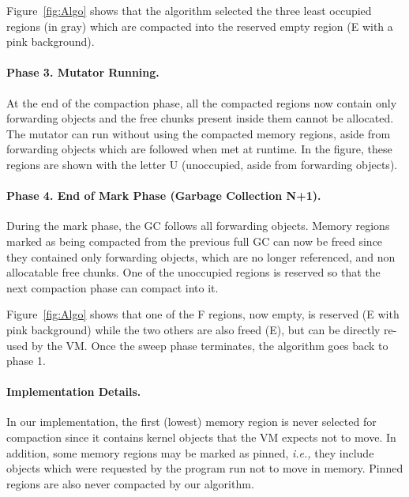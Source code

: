 \documentclass[sigplan,10pt,review,anonymous]{acmart}\settopmatter{printfolios=true,printccs=false,printacmref=false}
\newcommand{\egb}[1]{\color{blue}\fbox{\bfseries\sffamily\scriptsize Elisa:}{\sf\small$\blacktriangleright$\textit{#1}$\blacktriangleleft$}\color{black}}
\def\ie{\emph{i.e., }}
\begin{document}
Figure~\ref{fig:Algo} shows that the algorithm selected the three least occupied regions (in gray) which are compacted into the reserved empty region (E with a pink background).

\paragraph{Phase 3. Mutator Running.}  At the end of the compaction phase, all the compacted regions now contain only forwarding objects and the free chunks present inside them cannot be allocated. 
The mutator can run without using the compacted memory regions, aside from forwarding objects which are followed when met at runtime. In the figure, these regions are shown with the letter U (unoccupied, aside from forwarding objects).

\paragraph{Phase 4. End of Mark Phase (Garbage Collection N+1).} During the mark phase, the GC follows all forwarding objects. Memory regions marked as being compacted from the previous full GC can now be freed since they contained only forwarding objects, which are no longer referenced, and non allocatable free chunks. One of the unoccupied regions is reserved so that the next compaction phase can compact into it.

Figure~\ref{fig:Algo} shows that one of the F regions, now empty, is reserved (E with pink background) while the two others are also freed (E), but can be directly re-used by the VM. Once the sweep phase terminates, the algorithm goes back to phase 1.

\paragraph{Implementation Details.}
In our implementation, the first (lowest) memory region is never selected for compaction since it contains kernel objects that the VM expects not to move. In addition, some memory regions may be marked as pinned, \ie they include objects which were requested by the program run not to move in memory. Pinned regions are also never compacted by our algorithm.%
\end{document}
